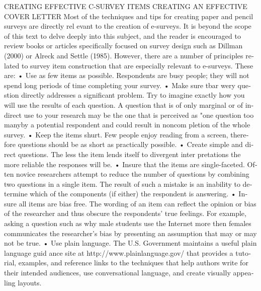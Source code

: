 \documentclass[a4 paper,12pt]{article}\usepackage{xepersian}
\begin{document}
\begin{latin}
\vspace{0.1cm}
CREATING EFFECTIVE C-SURVEY ITEMS 
\vspace{0.1cm}CREATING AN EFFECTIVE COVER LETTER 
\vspace{0.1cm}
\vspace{0.1cm}
\noindent
Most of the techniques and tips for creating paper and pencil surveys are directly rel evant to the creation of e-surveys. It is beyond the scope of this text to delve deeply into this subject, and the reader is encouraged to review books or articles specifically focused on survey design such as Dillman (2000) or Alreck and Settle (1985). However, there are a number of principles related to survey item construction that are especially relevant to e-surveys. These are: 
• Use as few items as possible. Respondents are busy people; they will not spend long 
periods of time completing your survey. 
• Make sure tbar wery question directly addresses a significant problem. Try to imagine 
exactly how you will use the results of each question. A question that is of only marginal or of indirect use to your research may be the one that is perceived as "one question too manyby a potential respondent and could result in noncom 
pletion of the whole survey. 
• Keep the items shurt. Few people enjoy reading from a screen, therefore questions 
should be as short as practically possible. 
• Create simple and direct questions. The less the item lends itself to divergent inter 
pretations the more reliable the responses will be. 
• Insure that the items are single-faceted. Often novice researchers attempt to reduce 
the number of questions by combining two questions in a single item. The result of such a mistake is an inability to determine which of the components (if either) 
the respondent is answering. 
• Insure all items are bias free. The wording of an item can reflect the opinion or bias 
of the researcher and thus obscure the respondents' true feelings. For example, asking a question such as why male students use the Internet more then females communicates the researcher's bias by presenting an assumption that may or may not be true. 
• Use plain language. The U.S. Government maintains a useful plain language guid 
ance site at http://www.plainlanguage.gov/ that provides a tutorial, examples, and reference links to the techniques that help authors write for their intended audiences, use conversational language, and create visually appealing layouts. 


\vspace{0.1cm}



\end{latin}
\end{document}
